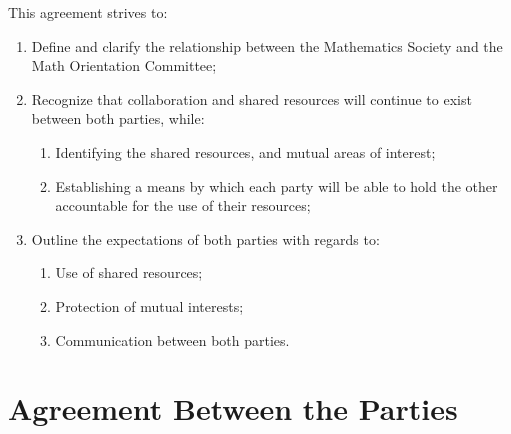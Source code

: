 \documentclass[12pt, letterpaper]{mathsoc}
\begin{document}
This agreement strives to:
\begin{enumerate}
    \item Define and clarify the relationship between the Mathematics Society and the Math Orientation Committee;
    \item Recognize that collaboration and shared resources will continue to exist between both parties, while:
    \begin{enumerate}
        \item Identifying the shared resources, and mutual areas of interest;
        \item Establishing a means by which each party will be able to hold the other accountable for the use of their resources;
    \end{enumerate}
    \item Outline the expectations of both parties with regards to:
    \begin{enumerate}
        \item Use of shared resources;
        \item Protection of mutual interests;
        \item Communication between both parties.
    \end{enumerate}
\end{enumerate}

\section{Agreement Between the Parties}
\end{document}

